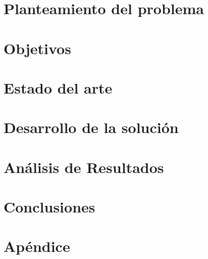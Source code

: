 \documentclass[book,spanish,a4paper,12pt]{tfg}
\begin{document}
\chapter{Planteamiento del problema}


\chapter{Objetivos}


\chapter{Estado del arte}


\chapter{Desarrollo de la solución}


\chapter{Análisis de Resultados}


\chapter{Conclusiones}



\pagestyle{appendix}

\appendix
\chapter{Apéndice}




\end{document}
